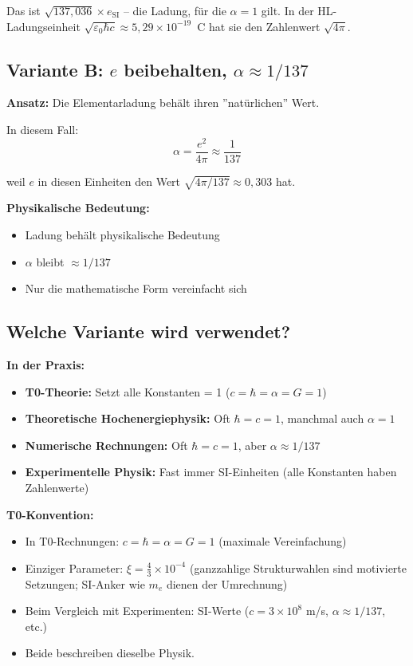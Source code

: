 	Das ist $\sqrt{137{,}036} \times e_{\text{SI}}$ -- die Ladung, für die $\alpha = 1$ gilt. In der HL-Ladungseinheit $\sqrt{\varepsilon_0\hbar c} \approx 5{,}29 \times 10^{-19}$~C hat sie den Zahlenwert $\sqrt{4\pi}$.
	
	\subsection{Variante B: $e$ beibehalten, $\alpha \approx 1/137$}
	
	\textbf{Ansatz:} Die Elementarladung behält ihren ''natürlichen'' Wert.
	
	In diesem Fall:
	\begin{equation}
		\alpha = \frac{e^2}{4\pi} \approx \frac{1}{137}
	\end{equation}
	
	weil $e$ in diesen Einheiten den Wert $\sqrt{4\pi/137} \approx 0{,}303$ hat.
	
	\textbf{Physikalische Bedeutung:}
	\begin{itemize}
		\item Ladung behält physikalische Bedeutung
		\item $\alpha$ bleibt $\approx 1/137$
		\item Nur die mathematische Form vereinfacht sich
	\end{itemize}
	
	\subsection{Welche Variante wird verwendet?}
	
	\textbf{In der Praxis:}
	\begin{itemize}
		\item \textbf{T0-Theorie:} Setzt alle Konstanten = 1 ($c = \hbar = \alpha = G = 1$)
		\item \textbf{Theoretische Hochenergiephysik:} Oft $\hbar = c = 1$, manchmal auch $\alpha = 1$
		\item \textbf{Numerische Rechnungen:} Oft $\hbar = c = 1$, aber $\alpha \approx 1/137$
		\item \textbf{Experimentelle Physik:} Fast immer SI-Einheiten (alle Konstanten haben Zahlenwerte)
	\end{itemize}
	
	\textbf{T0-Konvention:}
	\begin{itemize}
		\item In T0-Rechnungen: $c = \hbar = \alpha = G = 1$ (maximale Vereinfachung)
		\item Einziger Parameter: $\xi = \frac{4}{3} \times 10^{-4}$ (ganzzahlige Strukturwahlen sind motivierte Setzungen; SI-Anker wie $m_e$ dienen der Umrechnung)
		\item Beim Vergleich mit Experimenten: SI-Werte ($c = 3 \times 10^8$ m/s, $\alpha \approx 1/137$, etc.)
		\item Beide beschreiben dieselbe Physik.
	\end{itemize}
	
